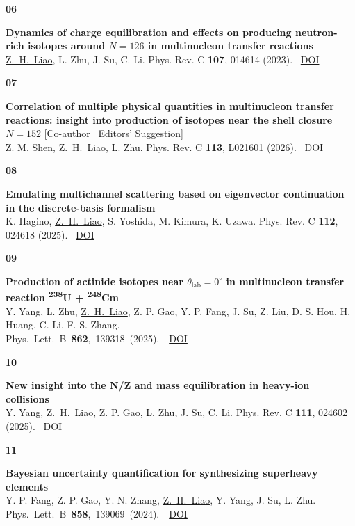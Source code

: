 \documentclass[10pt]{article}
\newlength{\numcol}
\newcommand{\cvnum}[2]{%
  \noindent\begin{minipage}[t]{\numcol}\color{accent}\bfseries #1\end{minipage}%
  \begin{minipage}[t]{\dimexpr\linewidth-\numcol\relax}#2\end{minipage}\par\vspace{7pt}%
}
\begin{document}
\cvnum{06}{\textbf{Dynamics of charge equilibration and effects on producing neutron-rich isotopes
  around $N=126$ in multinucleon transfer reactions} \\
  \underline{Z.~H.~Liao}, L. Zhu, J. Su, C. Li.
  Phys. Rev. C \textbf{107}, 014614 (2023).
  \textperiodcentered\ \href{https://journals.aps.org/prc/abstract/10.1103/PhysRevC.107.014614}{DOI}}

\cvnum{07}{\textbf{Correlation of multiple physical quantities in multinucleon transfer reactions:
  insight into production of isotopes near the shell closure $N=152$}
  \textcolor{accent}{[Co-author \textperiodcentered\ Editors' Suggestion]}\\
   Z. M. Shen, \underline{Z.~H.~Liao}, L. Zhu.
  Phys. Rev. C \textbf{113}, L021601 (2026).
  \textperiodcentered\ \href{https://doi.org/10.1103/xbtz-bvmc}{DOI}}

\cvnum{08}{\textbf{Emulating multichannel scattering based on eigenvector continuation in the
  discrete-basis formalism} \\
  K. Hagino, \underline{Z.~H.~Liao}, S. Yoshida, M. Kimura, K. Uzawa.
  Phys. Rev. C \textbf{112}, 024618 (2025).
  \textperiodcentered\ \href{https://journals.aps.org/prc/abstract/10.1103/zpsz-7jld}{DOI}}

\cvnum{09}{\textbf{Production of actinide isotopes near $\theta_{\mathrm{lab}}=0^{\circ}$ in
  multinucleon transfer
  reaction \textsuperscript{238}U + \textsuperscript{248}Cm} \\
  Y. Yang, L. Zhu, \underline{Z.~H.~Liao}, Z. P. Gao, Y. P. Fang, J. Su, Z. Liu, D. S. Hou, H. Huang, C. Li,
  F. S. Zhang.\\ \mbox{Phys. Lett. B \textbf{862}, 139318 (2025).
  \textperiodcentered\ \href{https://doi.org/10.1016/j.physletb.2025.139318}{DOI}}}

\cvnum{10}{\textbf{New insight into the N/Z and mass equilibration in heavy-ion collisions}
  \\
  Y. Yang, \underline{Z.~H.~Liao}, Z. P. Gao, L. Zhu, J. Su, C. Li.
  Phys. Rev. C \textbf{111}, 024602 (2025).
  \textperiodcentered\ \href{https://journals.aps.org/prc/abstract/10.1103/PhysRevC.111.024602}{DOI}}

\cvnum{11}{\textbf{Bayesian uncertainty quantification for synthesizing superheavy elements}
 \\
  Y. P. Fang, Z. P. Gao, Y. N. Zhang, \underline{Z.~H.~Liao}, Y. Yang, J. Su, L. Zhu. \mbox{Phys. Lett. B
  \textbf{858}, 139069 (2024).
  \textperiodcentered\ \href{https://doi.org/10.1016/j.physletb.2024.139069}{DOI}}}
\end{document}
